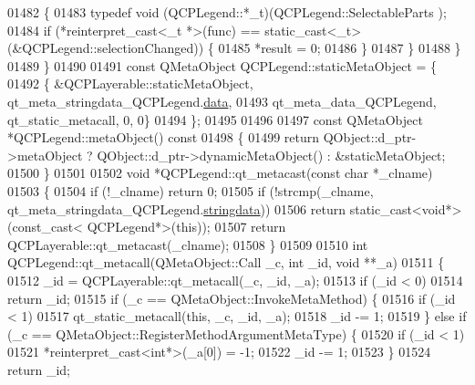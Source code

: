 \begin{DoxyCode}
01482         \{
01483             \textcolor{keyword}{typedef} void (QCPLegend::*\_t)(QCPLegend::SelectableParts );
01484             \textcolor{keywordflow}{if} (*reinterpret\_cast<\_t *>(func) == \textcolor{keyword}{static\_cast<}\_t\textcolor{keyword}{>}(&QCPLegend::selectionChanged)) \{
01485                 *result = 0;
01486             \}
01487         \}
01488     \}
01489 \}
01490 
01491 \textcolor{keyword}{const} QMetaObject QCPLegend::staticMetaObject = \{
01492     \{ &QCPLayerable::staticMetaObject, qt\_meta\_stringdata\_QCPLegend.\hyperlink{a00016_abb2a7af4ffa957bddb891b5663c0aa55}{data},
01493       qt\_meta\_data\_QCPLegend,  qt\_static\_metacall, 0, 0\}
01494 \};
01495 
01496 
01497 \textcolor{keyword}{const} QMetaObject *QCPLegend::metaObject()\textcolor{keyword}{ const}
01498 \textcolor{keyword}{}\{
01499     \textcolor{keywordflow}{return} QObject::d\_ptr->metaObject ? QObject::d\_ptr->dynamicMetaObject() : &staticMetaObject;
01500 \}
01501 
01502 \textcolor{keywordtype}{void} *QCPLegend::qt\_metacast(\textcolor{keyword}{const} \textcolor{keywordtype}{char} *\_clname)
01503 \{
01504     \textcolor{keywordflow}{if} (!\_clname) \textcolor{keywordflow}{return} 0;
01505     \textcolor{keywordflow}{if} (!strcmp(\_clname, qt\_meta\_stringdata\_QCPLegend.\hyperlink{a00016_a26b79395b8d9f94641f81b197841ede1}{stringdata}))
01506         \textcolor{keywordflow}{return} \textcolor{keyword}{static\_cast<}\textcolor{keywordtype}{void}*\textcolor{keyword}{>}(\textcolor{keyword}{const\_cast<} QCPLegend*\textcolor{keyword}{>}(\textcolor{keyword}{this}));
01507     \textcolor{keywordflow}{return} QCPLayerable::qt\_metacast(\_clname);
01508 \}
01509 
01510 \textcolor{keywordtype}{int} QCPLegend::qt\_metacall(QMetaObject::Call \_c, \textcolor{keywordtype}{int} \_id, \textcolor{keywordtype}{void} **\_a)
01511 \{
01512     \_id = QCPLayerable::qt\_metacall(\_c, \_id, \_a);
01513     \textcolor{keywordflow}{if} (\_id < 0)
01514         \textcolor{keywordflow}{return} \_id;
01515     \textcolor{keywordflow}{if} (\_c == QMetaObject::InvokeMetaMethod) \{
01516         \textcolor{keywordflow}{if} (\_id < 1)
01517             qt\_static\_metacall(\textcolor{keyword}{this}, \_c, \_id, \_a);
01518         \_id -= 1;
01519     \} \textcolor{keywordflow}{else} \textcolor{keywordflow}{if} (\_c == QMetaObject::RegisterMethodArgumentMetaType) \{
01520         \textcolor{keywordflow}{if} (\_id < 1)
01521             *\textcolor{keyword}{reinterpret\_cast<}\textcolor{keywordtype}{int}*\textcolor{keyword}{>}(\_a[0]) = -1;
01522         \_id -= 1;
01523     \}
01524     \textcolor{keywordflow}{return} \_id;

\end{DoxyCode}

